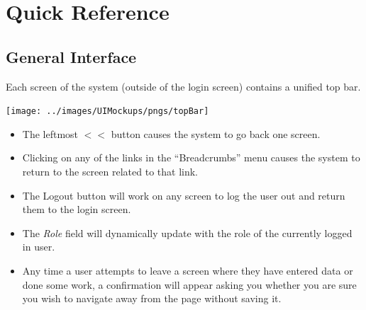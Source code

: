\documentclass{article}
\begin{document}
\section{Quick Reference}  %
\subsection{General Interface}
Each screen of the system (outside of the login screen) contains a unified top bar. \\
\centerline{\texttt{[image: ../images/UIMockups/pngs/topBar]}}
\begin{itemize}
  \item The leftmost $<<$ button causes the system to go back one screen. 
  \item Clicking on any of the links in the ``Breadcrumbs'' menu causes the system 
    to return to the screen related to that link. 
  \item The Logout button will work on any screen to log the user out and return
    them to the login screen.
  \item The \emph{Role} field will dynamically update with the role of the currently logged
    in user.
  \item Any time a user attempts to leave a screen where they have entered data or
    done some work, a confirmation will appear asking you whether you are sure
    you wish to navigate away from the page without saving it.
\end{itemize}
\end{document}
